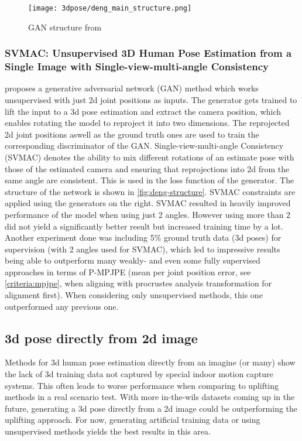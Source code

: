 \begin{figure*}[!htb]
 	\centering
 	\texttt{[image: 3dpose/deng\_main\_structure.png]}
 	\caption{GAN structure from \cite{Deng2021}}
 	\label{fig:deng-structure}
\end{figure*}
 
\subsubsection{SVMAC: Unsupervised 3D Human Pose Estimation from a Single Image with Single-view-multi-angle Consistency}
\cite{Deng2021} proposes a generative adversarial network (GAN) method which works unsupervised with just 2d joint positions as inputs. The generator gets trained to lift the input to a 3d pose estimation and extract the camera position, which enables rotating the model to reproject it into two dimensions. The reprojected 2d joint positions aswell as the ground truth ones are used to train the corresponding discriminator of the GAN. Single-view-multi-angle Consistency (SVMAC) denotes the ability to mix different rotations of an estimate pose with those of the estimated camera and ensuring that reprojections into 2d from the same angle are consistent. This is used in the loss function of the generator.
The structure of the network is shown in \autoref{fig:deng-structure}. SVMAC constraints are applied using the generators on the right.
SVMAC resulted in heavily improved performance of the model when using just 2 angles. However using more than 2 did not yield a significantly better result but increased training time by a lot.
Another experiment done was including 5\% ground truth data (3d poses) for supervision (with 2 angles used for SVMAC), which led to impressive results being able to outperform many weakly- and even some fully supervised approaches in terms of P-MPJPE (mean per joint position error, see \autoref{criteria:mpjpe}, when aligning with procrustes analysis transformation \cite{gower1975generalized} for alignment first). When considering only unsupervised methods, this one outperformed any previous one.
 
\subsection{3d pose directly from 2d image}
Methods for 3d human pose estimation directly from an imagine (or many) show the lack of 3d training data not captured by special indoor motion capture systems. This often leads to worse performance when comparing to uplifting methods in a real scenario test. With more in-the-wils datasets coming up in the future, generating a 3d pose directly from a 2d image could be outperforming the uplifting approach. For now, generating artificial training data or using unsupervised methods yields the best results in this area.
